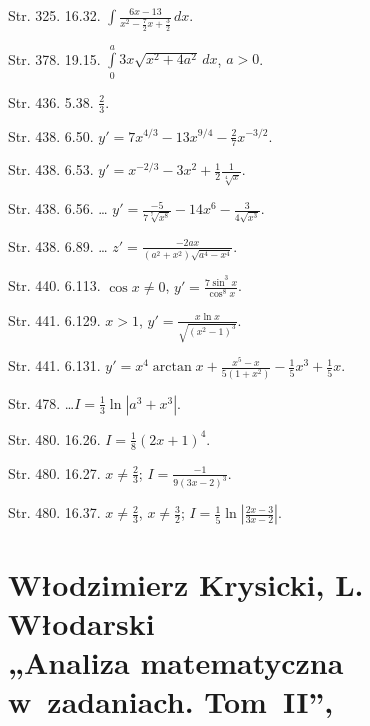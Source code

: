\documentclass[a4paper,11pt]{article}
\numberwithin{equation}{section}
\begin{document}
\VerSpaceTwo


Str. 325. 16.32.
$\int \frac{ 6 x - 13 }{ x^{ 2 } - \frac{ 7 }{ 2 } x + \frac{ 3 }{ 2 } }
\, dx$.

Str. 378. 19.15.
$\int\limits_{ 0 }^{ a } 3x \sqrt{ x^{ 2 } + 4 a^{ 2 } } \, dx$, $a > 0$.

Str. 436. 5.38. $\frac{ 2 }{ 3 }$.

Str. 438. 6.50.
$y' = 7 x^{ 4 / 3 } - 13 x^{ 9 / 4 } - \frac{ 2 }{ 7 } x^{ -3 / 2 }$.

Str. 438. 6.53.
$y' = x^{ -2 / 3 } - 3 x^{ 2 } + \frac{ 1 }{ 2 } \frac{ 1 }{ \sqrt[ 4 ]{ x } }$.

Str. 438. 6.56. \ldots
$y' = \frac{ -5 }{ 7 \sqrt[ 7 ]{ x^{ 8 } } } - 14 x^{ 6 }
- \frac{ 3 }{ 4 \sqrt{ x^{ 3 } } }$.

Str. 438. 6.89. \ldots
$z' = \frac{ -2 a x }{ ( a^{ 2 } + x^{ 2 } ) \sqrt{ a^{ 4 } - x^{ 4 } } }$.

Str. 440. 6.113. $\cos x \neq 0$, $y' = \frac{ 7 \sin^{ 3 } x }{ \cos^{ 8 } x }$.

Str. 441. 6.129. $x > 1$,
$y' = \frac{ x \ln x }{ \sqrt{ ( x^{ 2 } - 1 )^{ 3 } } }$.

Str. 441. 6.131.
$y' = x^{ 4 } \arctan x + \frac{ x^{ 5 } - x }{ 5 ( 1 + x^{ 2 } ) }
- \frac{ 1 }{ 5 } x^{ 3 } + \frac{ 1 }{ 5 } x$.

Str. 478. \ldots $I = \frac{ 1 }{ 3 } \ln| a^{ 3 } + x^{ 3 } |$.

Str. 480. 16.26. $I = \frac{ 1 }{ 8 } ( 2 x + 1 )^{ 4 }$.

Str. 480. 16.27. $x \neq \frac{ 2 }{ 3 }$;
$I = \frac{ -1 }{ 9 ( 3 x - 2 )^{ 3 } }$.

Str. 480. 16.37. $x \neq \frac{ 2 }{ 3 }$, $x \neq \frac{ 3 }{ 2 }$;
$I = \frac{ 1 }{ 5 } \ln| \frac{ 2 x - 3 }{ 3 x - 2 } |$.













\section{ %
  Włodzimierz Krysicki, L. Włodarski \\
  „Analiza matematyczna w~zadaniach. Tom~II”,
  \cite{KrysickiWlodarskiAnalizaWZadaniachVolII2004} }
\end{document}
